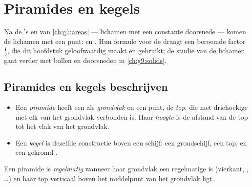 \chapter{Piramides en kegels}\label{ch:g8:solids}

Na de 's en  van \cref{ch:g7:areas} --- lichamen met een constante
doorsnede --- komen de lichamen met een punt:  en . Hun formule
voor de  draagt een beroemde factor $\frac13$, die dit hoofdstuk
geloofwaardig maakt en gebruikt; de studie van de lichamen gaat verder met bollen
en doorsneden in \cref{ch:g9:solids}.

\section{Piramides en kegels beschrijven}

\begin{definition}\label{def:g8:solids:def}
\begin{itemize}
  \item Een \emph{piramide} heeft een  als
        \emph{grondvlak} en een punt, de \emph{top}, die met driehoekige
         met elk  van het grondvlak verbonden is. Haar
        \emph{hoogte} is de afstand van de top tot het vlak van het grondvlak.
  \item Een \emph{kegel} is dezelfde constructie boven een schijf:
        een grondschijf, een top, en een gekromd .
\end{itemize}
Een piramide is \emph{regelmatig} wanneer haar grondvlak een regelmatige 
is (vierkant, , \dots) en haar top verticaal boven het
middelpunt van het grondvlak ligt.
\end{definition}

